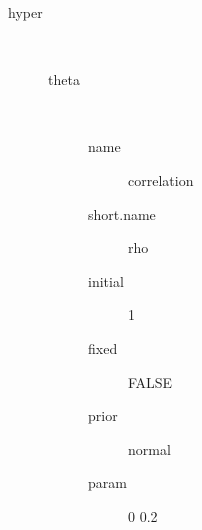 \begin{description}
	\item[hyper]\ 
	 \begin{description}
	 	\item[theta]\ 
	 	 \begin{description}
	 	 	 \item[ name ] correlation 
	 	 	 \item[ short.name ] rho 
	 	 	 \item[ initial ] 1 
	 	 	 \item[ fixed ] FALSE 
	 	 	 \item[ prior ] normal 
	 	 	 \item[ param ] 0 0.2 
	 	 \end{description}
	 \end{description}
\end{description}
